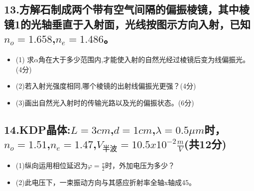 \documentclass[11pt,a4paper]{article}
\begin{document}
    \subsection*{13.方解石制成两个带有空气间隔的偏振棱镜，其中棱镜1的光轴垂直于入射面，光线按图示方向入射，已知$n_o=1.658$,$n_e=1.486$。}
    \begin{itemize}
        \vspace{-3mm}
        \item (1) 求$\alpha $角在大于多少范围内,才能使入射的自然光经过棱镜后变为线偏振光。(4分)
        \vspace{-3mm}
        \item (2)若入射光强度相同,哪个棱镜的出射线偏振光更强？(4分)
        \vspace{-3mm}
        \item (3)画出自然光入射时的传输光路以及光的偏振状态。(6分)
    \end{itemize}
    \vspace{-3mm}
    \subsection*{14.KDP晶体:$L=3cm$,$d=1cm$,$\lambda =0.5\mu m$时，$n_o=1.51$,$n_e=1.47$,$V_\text{半波}=10.5x10^{-2} \frac{m}{V}$(共12分)}
    \begin{itemize}
        \vspace{-3mm}
        \item (1)纵向运用相位延迟为$\varphi = \frac{\pi}{2}时，外加电压为多少？$
        \vspace{-3mm}
        \item (2)此电压下，一束振动方向与其感应折射率全轴x轴成45。
    \end{itemize}
    \vspace{-3mm}
\end{document}
